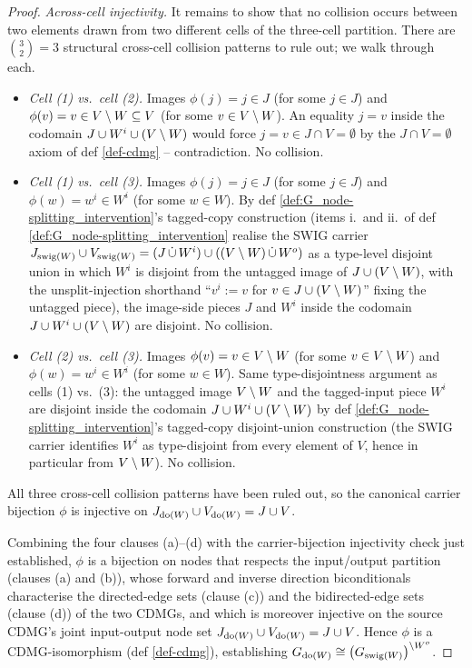 \documentclass[main]{subfiles}
\begin{document}
\begin{proof}
\emph{Across-cell injectivity.}
It remains to show that no collision occurs between two elements drawn from two different cells of the three-cell partition. There are $\binom{3}{2} = 3$ structural cross-cell collision patterns to rule out; we walk through each.
\begin{itemize}
    \item \emph{Cell (1) vs.\ cell (2).} Images $\phi(j) = j \in J$ (for some $j \in J$) and $\phi(v) = v \in V \setminus W \subseteq V$ (for some $v \in V \setminus W$). An equality $j = v$ inside the codomain $J \cup W^i \cup (V \setminus W)$ would force $j = v \in J \cap V = \emptyset$ by the $J \cap V = \emptyset$ axiom of def \ref{def-cdmg} -- contradiction. No collision.
    \item \emph{Cell (1) vs.\ cell (3).} Images $\phi(j) = j \in J$ (for some $j \in J$) and $\phi(w) = w^i \in W^i$ (for some $w \in W$). By def \ref{def:G_node-splitting_intervention}'s tagged-copy construction (items i.\ and ii.\ of def \ref{def:G_node-splitting_intervention} realise the SWIG carrier $J_{\mathrm{swig}(W)} \cup V_{\mathrm{swig}(W)} = (J \,\dot{\cup}\, W^i) \cup ((V \setminus W) \,\dot{\cup}\, W^o)$ as a type-level disjoint union in which $W^i$ is disjoint from the untagged image of $J \cup (V \setminus W)$, with the unsplit-injection shorthand ``$v^i := v$ for $v \in J \cup (V \setminus W)$'' fixing the untagged piece), the image-side pieces $J$ and $W^i$ inside the codomain $J \cup W^i \cup (V \setminus W)$ are disjoint. No collision.
    \item \emph{Cell (2) vs.\ cell (3).} Images $\phi(v) = v \in V \setminus W$ (for some $v \in V \setminus W$) and $\phi(w) = w^i \in W^i$ (for some $w \in W$). Same type-disjointness argument as cells (1) vs.\ (3): the untagged image $V \setminus W$ and the tagged-input piece $W^i$ are disjoint inside the codomain $J \cup W^i \cup (V \setminus W)$ by def \ref{def:G_node-splitting_intervention}'s tagged-copy disjoint-union construction (the SWIG carrier identifies $W^i$ as type-disjoint from every element of $V$, hence in particular from $V \setminus W$). No collision.
\end{itemize}
All three cross-cell collision patterns have been ruled out, so the canonical carrier bijection $\phi$ is injective on $J_{\operatorname{do}(W)} \cup V_{\operatorname{do}(W)} = J \cup V$. \checkmark

\medskip
Combining the four clauses (a)--(d) with the carrier-bijection injectivity check just established, $\phi$ is a bijection on nodes that respects the input/output partition (clauses (a) and (b)), whose forward and inverse direction biconditionals characterise the directed-edge sets (clause (c)) and the bidirected-edge sets (clause (d)) of the two CDMGs, and which is moreover injective on the source CDMG's joint input-output node set $J_{\operatorname{do}(W)} \cup V_{\operatorname{do}(W)} = J \cup V$. Hence $\phi$ is a CDMG-isomorphism (def \ref{def-cdmg}), establishing $G_{\operatorname{do}(W)} \cong \left ( G_{\mathrm{swig}(W)} \right )^{\setminus W^o}$.
\end{proof}
\end{document}
